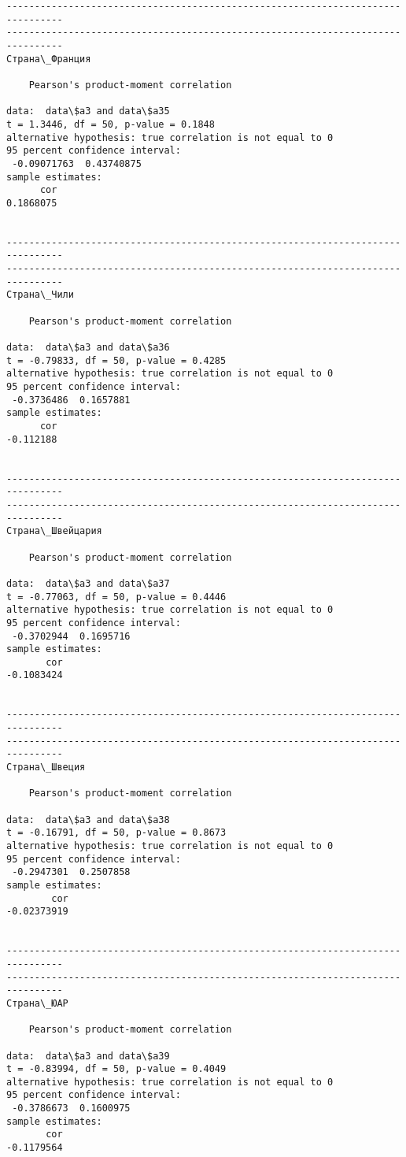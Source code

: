 \documentclass[11pt,mathletters]{article}
\begin{document}
\begin{Verbatim}[commandchars=\\\{\}]
--------------------------------------------------------------------------------
--------------------------------------------------------------------------------
Страна\_Франция

	Pearson's product-moment correlation

data:  data\$a3 and data\$a35
t = 1.3446, df = 50, p-value = 0.1848
alternative hypothesis: true correlation is not equal to 0
95 percent confidence interval:
 -0.09071763  0.43740875
sample estimates:
      cor 
0.1868075 


--------------------------------------------------------------------------------
--------------------------------------------------------------------------------
Страна\_Чили

	Pearson's product-moment correlation

data:  data\$a3 and data\$a36
t = -0.79833, df = 50, p-value = 0.4285
alternative hypothesis: true correlation is not equal to 0
95 percent confidence interval:
 -0.3736486  0.1657881
sample estimates:
      cor 
-0.112188 


--------------------------------------------------------------------------------
--------------------------------------------------------------------------------
Страна\_Швейцария

	Pearson's product-moment correlation

data:  data\$a3 and data\$a37
t = -0.77063, df = 50, p-value = 0.4446
alternative hypothesis: true correlation is not equal to 0
95 percent confidence interval:
 -0.3702944  0.1695716
sample estimates:
       cor 
-0.1083424 


--------------------------------------------------------------------------------
--------------------------------------------------------------------------------
Страна\_Швеция

	Pearson's product-moment correlation

data:  data\$a3 and data\$a38
t = -0.16791, df = 50, p-value = 0.8673
alternative hypothesis: true correlation is not equal to 0
95 percent confidence interval:
 -0.2947301  0.2507858
sample estimates:
        cor 
-0.02373919 


--------------------------------------------------------------------------------
--------------------------------------------------------------------------------
Страна\_ЮАР

	Pearson's product-moment correlation

data:  data\$a3 and data\$a39
t = -0.83994, df = 50, p-value = 0.4049
alternative hypothesis: true correlation is not equal to 0
95 percent confidence interval:
 -0.3786673  0.1600975
sample estimates:
       cor 
-0.1179564 



\end{Verbatim}
\end{document}
